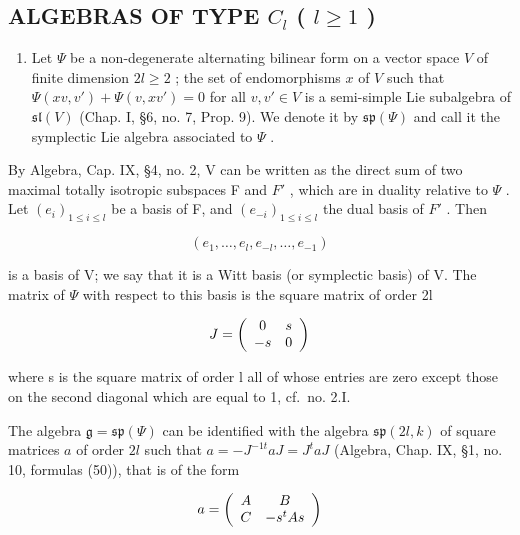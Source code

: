 \subsection{\texorpdfstring{ALGEBRAS OF TYPE \(C_{l}\) ( \(l \geq 1\) )}{ALGEBRAS OF TYPE C\_\{l\} ( l \textbackslash geq 1 )}}

\begin{enumerate}
\def\labelenumi{(\Roman{enumi})}
\tightlist
\item
  Let \(\varPsi\) be a non-degenerate alternating bilinear form on a vector space \(V\) of finite dimension \(2l \geq 2\) ; the set of endomorphisms \(x\) of \(V\) such that \(\varPsi(xv, v') + \varPsi(v, xv') = 0\) for all \(v, v' \in V\) is a semi-simple Lie subalgebra of \(\mathfrak{sl}(V)\) (Chap. I, §6, no. 7, Prop. 9). We denote it by \(\mathfrak{sp}(\varPsi)\) and call it the symplectic Lie algebra associated to \(\varPsi\) .
\end{enumerate}

By Algebra, Cap. IX, §4, no. 2, V can be written as the direct sum of two maximal totally isotropic subspaces F and \(F'\) , which are in duality relative to \(\Psi\) . Let \((e_{i})_{1\leq i\leq l}\) be a basis of F, and \((e_{-i})_{1\leq i\leq l}\) the dual basis of \(F'\) . Then

\[
(e _ {1}, \dots , e _ {l}, e _ {- l}, \dots , e _ {- 1})
\]

is a basis of V; we say that it is a Witt basis (or symplectic basis) of V. The matrix of \(\varPsi\) with respect to this basis is the square matrix of order 2l

\[
J = \left( \begin{array}{c c} 0 & s \\ - s & 0 \end{array} \right)
\]

where s is the square matrix of order l all of whose entries are zero except those on the second diagonal which are equal to 1, cf.~no. 2.I.

The algebra \(\mathfrak{g} = \mathfrak{sp}(\varPsi)\) can be identified with the algebra \(\mathfrak{sp}(2l,k)\) of square matrices \(a\) of order \(2l\) such that \(a = -J^{-1t}aJ = J^t aJ\) (Algebra, Chap. IX, §1, no. 10, formulas (50)), that is of the form

\[
a = \left( \begin{array}{c c} A & B \\ C & - s ^ {t} A s \end{array} \right)
\]


